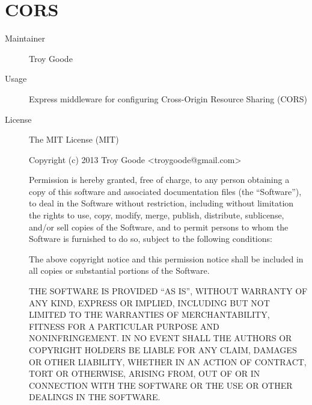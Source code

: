   \section*{CORS}
    \begin{description}
      \item[Maintainer] Troy Goode 
      \item[Usage] Express middleware for configuring Cross-Origin Resource Sharing (CORS)
      \item[License] \scriptsize The MIT License (MIT)

        Copyright (c) 2013 Troy Goode <troygoode@gmail.com>

        Permission is hereby granted, free of charge, to any person obtaining a copy of this software and associated documentation files (the ``Software''), to deal in the Software without restriction, including without limitation the rights to use, copy, modify, merge, publish, distribute, sublicense, and/or sell copies of the Software, and to permit persons to whom the Software is furnished to do so, subject to the following conditions:

        The above copyright notice and this permission notice shall be included in all copies or substantial portions of the Software.

        THE SOFTWARE IS PROVIDED ``AS IS'', WITHOUT WARRANTY OF ANY KIND, EXPRESS OR IMPLIED, INCLUDING BUT NOT LIMITED TO THE WARRANTIES OF MERCHANTABILITY, FITNESS FOR A PARTICULAR PURPOSE AND NONINFRINGEMENT. IN NO EVENT SHALL THE AUTHORS OR COPYRIGHT HOLDERS BE LIABLE FOR ANY CLAIM, DAMAGES OR OTHER LIABILITY, WHETHER IN AN ACTION OF CONTRACT, TORT OR OTHERWISE, ARISING FROM, OUT OF OR IN CONNECTION WITH THE SOFTWARE OR THE USE OR OTHER DEALINGS IN THE SOFTWARE.
    \end{description}

